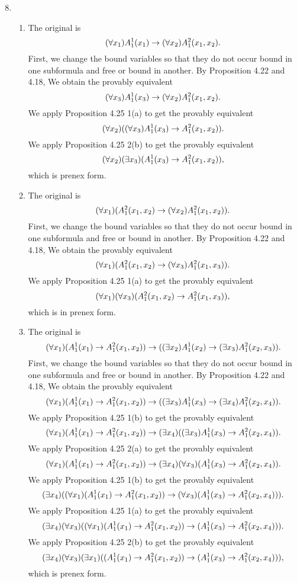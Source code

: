 \solutions{}
\begin{enumerate}
  \setcounter{enumi}{7}
  \item %
    \begin{enumerate}
      \item The original \wf{} is
        \[(\forall x_1)A^1_1(x_1) \rightarrow (\forall x_2)A^2_1(x_1, x_2).\]
        First, we change the bound variables so that they do not occur bound in one subformula and free or bound in another. By Proposition 4.22 and 4.18, We obtain the provably equivalent \wf{}
        \[(\forall x_3)A^1_1(x_3) \rightarrow (\forall x_2)A^2_1(x_1, x_2).\]
        We apply Proposition 4.25 1(a) to get the provably equivalent \wf{}
        \[(\forall x_2)((\forall x_3)A^1_1(x_3) \rightarrow A^2_1(x_1, x_2)).\]
        We apply Proposition 4.25 2(b) to get the provably equivalent \wf{}
        \[(\forall x_2)(\exists x_3)(A^1_1(x_3) \rightarrow A^2_1(x_1, x_2)),\]
        which is prenex form.

      \item The original \wf{} is
        \[(\forall x_1)(A^2_1(x_1, x_2) \rightarrow (\forall x_2)A^2_1(x_1, x_2)).\]
        First, we change the bound variables so that they do not occur bound in one subformula and free or bound in another. By Proposition 4.22 and 4.18, We obtain the provably equivalent \wf{}
        \[(\forall x_1)(A^2_1(x_1, x_2) \rightarrow (\forall x_3)A^2_1(x_1, x_3)).\]
        We apply Proposition 4.25 1(a) to get the provably equivalent \wf{}
        \[(\forall x_1)(\forall x_3)(A^2_1(x_1, x_2) \rightarrow A^2_1(x_1, x_3)),\]
        which is in prenex form.

      \item The original \wf{} is
        \[(\forall x_1)(A^1_1(x_1) \rightarrow A^2_1(x_1, x_2)) \rightarrow ((\exists x_2)A^1_1(x_2) \rightarrow (\exists x_3)A^2_1(x_2, x_3)).\]
        First, we change the bound variables so that they do not occur bound in one subformula and free or bound in another. By Proposition 4.22 and 4.18, We obtain the provably equivalent \wf{}
        \[(\forall x_1)(A^1_1(x_1) \rightarrow A^2_1(x_1, x_2)) \rightarrow ((\exists x_3)A^1_1(x_3) \rightarrow (\exists x_4)A^2_1(x_2, x_4)).\]
        We apply Proposition 4.25 1(b) to get the provably equivalent \wf{}
        \[(\forall x_1)(A^1_1(x_1) \rightarrow A^2_1(x_1, x_2)) \rightarrow (\exists x_4)((\exists x_3)A^1_1(x_3) \rightarrow A^2_1(x_2, x_4)).\]
        We apply Proposition 4.25 2(a) to get the provably equivalent \wf{}
        \[(\forall x_1)(A^1_1(x_1) \rightarrow A^2_1(x_1, x_2)) \rightarrow (\exists x_4)(\forall x_3)(A^1_1(x_3) \rightarrow A^2_1(x_2, x_4)).\]
        We apply Proposition 4.25 1(b) to get the provably equivalent \wf{}
        \[(\exists x_4)((\forall x_1)(A^1_1(x_1) \rightarrow A^2_1(x_1, x_2)) \rightarrow (\forall x_3)(A^1_1(x_3) \rightarrow A^2_1(x_2, x_4))).\]
        We apply Proposition 4.25 1(a) to get the provably equivalent \wf{}
        \[(\exists x_4)(\forall x_3)((\forall x_1)(A^1_1(x_1) \rightarrow A^2_1(x_1, x_2)) \rightarrow (A^1_1(x_3) \rightarrow A^2_1(x_2, x_4))).\]
        We apply Proposition 4.25 2(b) to get the provably equivalent \wf{}
        \[(\exists x_4)(\forall x_3)(\exists x_1)((A^1_1(x_1) \rightarrow A^2_1(x_1, x_2)) \rightarrow (A^1_1(x_3) \rightarrow A^2_1(x_2, x_4))),\]
        which is prenex form.


\end{enumerate}
\end{enumerate}
